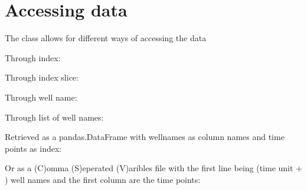 \documentclass[letterpaper,10pt,english]{sphinxmanual}
\begin{document}
\section{Accessing data}
\label{\detokenize{cookbook:accessing-data}}
The  class allows for different ways of accessing the data

Through index:

%
\begin{sphinxVerbatim}[commandchars=\\\{\}]
\PYG{p}{[}\PYG{p}{]}
\end{sphinxVerbatim}

Through index slice:

%
\begin{sphinxVerbatim}[commandchars=\\\{\}]
\PYG{p}{[}\PYG{p}{]}
\end{sphinxVerbatim}

Through well name:

%
\begin{sphinxVerbatim}[commandchars=\\\{\}]
\PYG{p}{[}\PYG{p}{]}
\end{sphinxVerbatim}

Through list of well names:

%
\begin{sphinxVerbatim}[commandchars=\\\{\}]
\PYG{p}{[}\PYG{p}{[}\PYG{p}{]}\PYG{p}{]}
\end{sphinxVerbatim}

Retrieved as a pandas.DataFrame with wellnames as column names and
time points as index:

%
\begin{sphinxVerbatim}[commandchars=\\\{\}]
  
\end{sphinxVerbatim}

Or as a (C)omma (S)eperated (V)aribles file with the first line
being (time unit + ) well names and the first column are the
time points:
\end{document}
